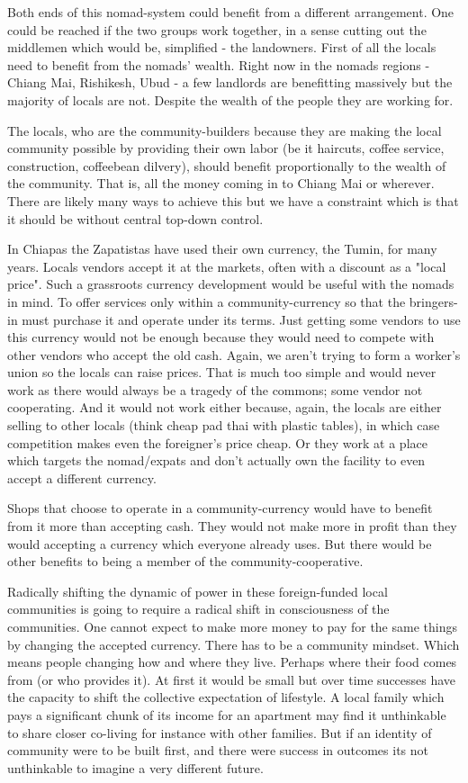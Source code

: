 Both ends of this nomad-system could benefit from a different arrangement. One could be reached if the two groups work together, in a sense cutting out the middlemen which would be, simplified - the landowners. First of all the locals need to benefit from the nomads' wealth. Right now in the nomads regions - Chiang Mai, Rishikesh, Ubud - a few landlords are benefitting massively but the majority of locals are not. Despite the wealth of the people they are working for.

The locals, who are the community-builders because they are making the local community possible by providing their own labor (be it haircuts, coffee service, construction, coffeebean dilvery), should benefit proportionally to the wealth of the community. That is, all the money coming in to Chiang Mai or wherever. There are likely many ways to achieve this but we have a constraint which is that it should be without central top-down control.

In Chiapas the Zapatistas have used their own currency, the Tumin, for many years. Locals vendors accept it at the markets, often with a discount as a "local price". Such a grassroots currency development would be useful with the nomads in mind. To offer services only within a community-currency so that the bringers-in must purchase it and operate under its terms. Just getting some vendors to use this currency would not be enough because they would need to compete with other vendors who accept the old cash. Again, we aren't trying to form a worker's union so the locals can raise prices. That is much too simple and would never work as there would always be a tragedy of the commons; some vendor not cooperating. And it would not work either because, again, the locals are either selling to other locals (think cheap pad thai with plastic tables), in which case competition makes even the foreigner's price cheap. Or they work at a place which targets the nomad/expats and don't actually own the facility to even accept a different currency.

Shops that choose to operate in a community-currency would have to benefit from it more than accepting cash. They would not make more in profit than they would accepting a currency which everyone already uses. But there would be other benefits to being a member of the community-cooperative.

Radically shifting the dynamic of power in these foreign-funded local communities is going to require a radical shift in consciousness of the communities. One cannot expect to make more money to pay for the same things by changing the accepted currency. There has to be a community mindset. Which means people changing how and where they live. Perhaps where their food comes from (or who provides it). At first it would be small but over time successes have the capacity to shift the collective expectation of lifestyle. A local family which pays a significant chunk of its income for an apartment may find it unthinkable to share closer co-living for instance with other families. But if an identity of community were to be built first, and there were success in outcomes its not unthinkable to imagine a very different future.

